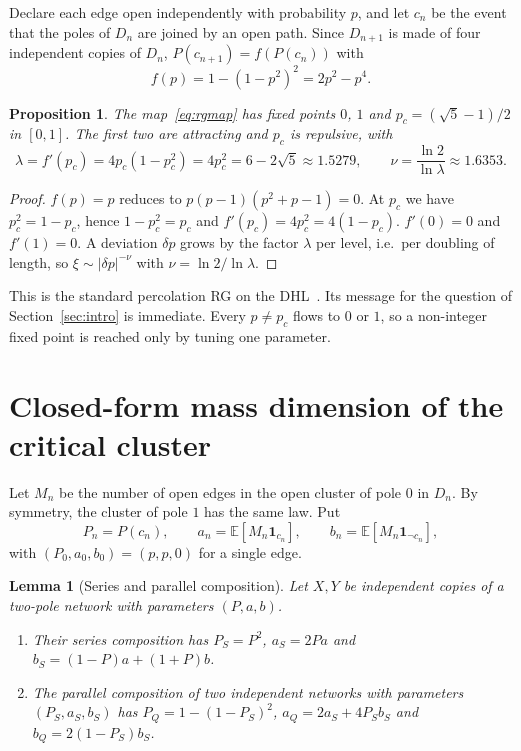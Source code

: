 \documentclass[11pt]{article}
\newtheorem{proposition}{Proposition}[section]
\newtheorem{lemma}{Lemma}[section]
\theoremstyle{remark}\newtheorem*{remark}{Remark}
\newcommand{\EE}{\mathbb{E}}
\begin{document}
Declare each edge open independently with probability $p$, and let $c_n$ be the event that the poles of $D_n$ are joined
by an open path. Since $D_{n+1}$ is made of four independent copies of $D_n$, $P(c_{n+1})=f(P(c_n))$ with
\begin{equation}
f(p)=1-(1-p^2)^2=2p^2-p^4 .
\label{eq:rgmap}
\end{equation}

\begin{proposition}
\label{prop:rg}
The map~\eqref{eq:rgmap} has fixed points $0$, $1$ and $p_c=(\sqrt5-1)/2$ in $[0,1]$. The first two are attracting and
$p_c$ is repulsive, with
\begin{equation}
\lambda=f'(p_c)=4p_c(1-p_c^2)=4p_c^2=6-2\sqrt5\approx1.5279,\qquad \nu=\frac{\ln2}{\ln\lambda}\approx1.6353 .
\end{equation}
\end{proposition}

\begin{proof}
$f(p)=p$ reduces to $p(p-1)(p^2+p-1)=0$. At $p_c$ we have $p_c^2=1-p_c$, hence $1-p_c^2=p_c$ and $f'(p_c)=4p_c^2=4(1-p_c)$.
$f'(0)=0$ and $f'(1)=0$. A deviation $\delta p$ grows by the factor $\lambda$ per level, i.e.\ per doubling of length, so
$\xi\sim|\delta p|^{-\nu}$ with $\nu=\ln2/\ln\lambda$.
\end{proof}

This is the standard percolation RG on the DHL~\cite{HamblyKumagai}. Its message for the question of
Section~\ref{sec:intro} is immediate. Every $p\neq p_c$ flows to $0$ or $1$, so a non-integer fixed point is reached
only by tuning one parameter.

\section{Closed-form mass dimension of the critical cluster}
\label{sec:mass}

Let $M_n$ be the number of open edges in the open cluster of pole $0$ in $D_n$. By symmetry, the cluster of pole $1$ has the
same law. Put
\begin{equation}
P_n=P(c_n),\qquad a_n=\EE[M_n\mathbf 1_{c_n}],\qquad b_n=\EE[M_n\mathbf 1_{\neg c_n}],
\end{equation}
with $(P_0,a_0,b_0)=(p,p,0)$ for a single edge.

\begin{lemma}[Series and parallel composition]
\label{lem:comp}
Let $X,Y$ be independent copies of a two-pole network with parameters $(P,a,b)$.
\begin{enumerate}
\item[(i)] Their series composition has $P_S=P^2$, $a_S=2Pa$ and $b_S=(1-P)a+(1+P)b$.
\item[(ii)] The parallel composition of two independent networks with parameters $(P_S,a_S,b_S)$ has
$P_Q=1-(1-P_S)^2$, $a_Q=2a_S+4P_Sb_S$ and $b_Q=2(1-P_S)b_S$.
\end{enumerate}
\end{lemma}
\end{document}
